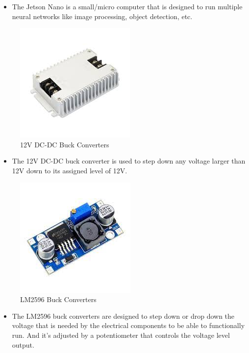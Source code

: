 \documentclass[a4paper, 10pt]{article}
\begin{document}
\begin{itemize}
\item
	The Jetson Nano is a small/micro computer that is designed to run multiple neural networks like image processing, object detection, etc. 
\end{itemize}


\begin{figure} [!h]
			\centering
			\includegraphics[scale=0.25]{Photos/12V DC-DC buck converter}
			\caption{12V DC-DC Buck Converters}
		\end{figure}
		

\begin{itemize}
\item
	The 12V DC-DC buck converter is used to step down any voltage larger than 12V down to its assigned level of 12V.
\end{itemize}


\begin{figure} [!h]
			\centering
			\includegraphics[scale=0.3]{Photos/LM2596 bucks}
			\caption{LM2596 Buck Converters}
		\end{figure}


\begin{itemize}
\item
	The LM2596 buck converters are designed to step down or drop down the voltage that is needed by the electrical components to be able to functionally run. And it's adjusted by a potentiometer that controls the voltage level output.
\end{itemize}
\end{document}

